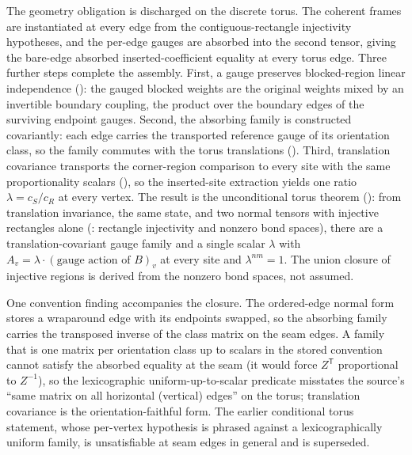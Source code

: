 \documentclass{article}
\begin{document}
The geometry obligation is discharged on the discrete torus. The coherent frames are
instantiated at every edge from the contiguous-rectangle injectivity hypotheses, and
the per-edge gauges are absorbed into the second tensor, giving the bare-edge absorbed
inserted-coefficient equality at every torus edge. Three further steps complete the
assembly. First, a gauge preserves blocked-region linear independence
(): the gauged blocked weights are the
original weights mixed by an invertible boundary coupling, the product over the
boundary edges of the surviving endpoint gauges. Second, the absorbing family is
constructed covariantly: each edge carries the transported reference gauge of its
orientation class, so the family commutes with the torus translations
(). Third, translation covariance
transports the corner-region comparison to every site with the same proportionality
scalars (), so the inserted-site extraction
yields one ratio $\lambda = c_S/c_R$ at every vertex. The result is the unconditional
torus theorem (): from
translation invariance, the same state, and two normal tensors with injective
rectangles alone (: rectangle injectivity and nonzero
bond spaces), there are a translation-covariant gauge family
and a single scalar $\lambda$ with $A_v = \lambda\cdot(\text{gauge action of } B)_v$ at
every site and $\lambda^{nm}=1$. The union closure of injective regions is derived
from the nonzero bond spaces, not assumed.

One convention finding accompanies the closure. The ordered-edge normal form stores a
wraparound edge with its endpoints swapped, so the absorbing family carries the
transposed inverse of the class matrix on the seam edges. A family that is one matrix
per orientation class up to scalars in the stored convention cannot satisfy the
absorbed equality at the seam (it would force $Z^{\mathsf T}$ proportional to
$Z^{-1}$), so the lexicographic uniform-up-to-scalar predicate misstates the source's
``same matrix on all horizontal (vertical) edges'' on the torus; translation
covariance is the orientation-faithful form. The earlier conditional torus statement,
whose per-vertex hypothesis is phrased against a lexicographically uniform family, is
unsatisfiable at seam edges in general and is superseded.
\end{document}
